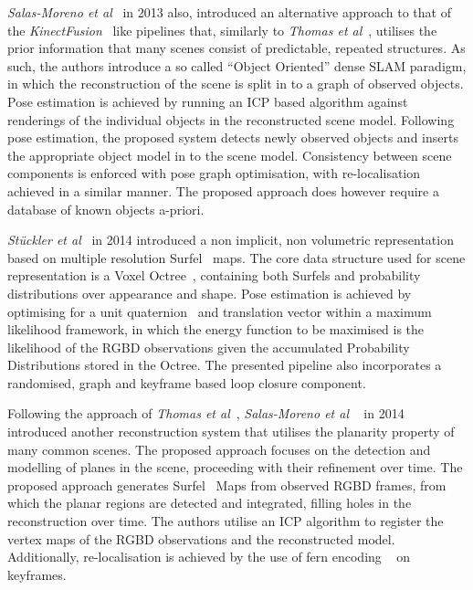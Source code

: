 \textit{Salas-Moreno et al}~\cite{Salas-Moreno2013} in 2013 also, introduced an alternative 
approach to that of the \textit{KinectFusion}~\cite{Newcombe2011} like pipelines that, similarly to 
\textit{Thomas et al}~\cite{Thomas2013}, utilises the prior information that many scenes consist 
of predictable, repeated structures. As such, the authors introduce a so called ``Object Oriented'' 
dense SLAM paradigm, in which the reconstruction of the scene is split in to a graph of observed 
objects. Pose estimation is achieved by running an ICP based algorithm against renderings of the 
individual objects in the reconstructed scene model. Following pose estimation, the proposed 
system detects newly observed objects and inserts the appropriate object model in to the scene 
model. Consistency between scene components is enforced with pose graph optimisation, with 
re-localisation achieved in a similar manner. The proposed approach does however require a 
database of known objects a-priori.

\textit{St{\"u}ckler et al}~\cite{Stuckler2014} in 2014 introduced a non implicit, non volumetric 
representation based on multiple resolution Surfel~\cite{Pfister2000} maps. The core data structure 
used for scene representation is a Voxel Octree~\cite{Laine2010}, containing both Surfels and 
probability distributions over appearance and shape. Pose estimation is achieved by optimising for 
a unit quaternion~\cite{Mukundan2002} and translation vector within a maximum likelihood framework, 
in which the energy function to be maximised is the likelihood of the RGBD observations given the 
accumulated Probability Distributions stored in the Octree. The presented pipeline also incorporates 
a randomised, graph and keyframe based loop closure component.

Following the approach of \textit{Thomas et al}~\cite{Thomas2013}, \textit{Salas-Moreno et al} 
~\cite{Salas-Moreno2014} in 2014 introduced another reconstruction system that utilises the
planarity property of many common scenes. The proposed approach focuses on the detection and 
modelling of planes in the scene, proceeding with their refinement over time. 
The proposed approach generates Surfel~\cite{Pfister2000} Maps from observed RGBD frames, from 
which the planar regions are detected and integrated, filling holes in the reconstruction over time.
The authors utilise an ICP algorithm to register the vertex maps of the RGBD observations and the 
reconstructed model. Additionally, re-localisation is achieved by the use of fern encoding 
~\cite{Glocker2014} on keyframes. 

